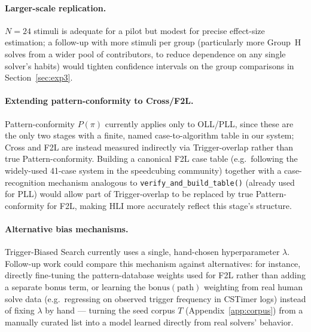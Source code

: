 \documentclass[10pt,conference]{article}
\begin{document}
\paragraph{Larger-scale replication.} $N=24$ stimuli is adequate for
a pilot but modest for precise effect-size estimation; a
follow-up with more stimuli per group (particularly more Group~H
solves from a wider pool of contributors, to reduce dependence on
any single solver's habits) would tighten confidence intervals on
the group comparisons in Section~\ref{sec:exp3}.

\paragraph{Extending pattern-conformity to Cross/F2L.}
Pattern-conformity $P(\pi)$ currently applies only to OLL/PLL, since
these are the only two stages with a finite, named
case-to-algorithm table in our system; Cross and F2L are instead
measured indirectly via Trigger-overlap rather than true
Pattern-conformity. Building a canonical F2L case table (e.g.\
following the widely-used 41-case system in the speedcubing
community) together with a case-recognition mechanism analogous to
\texttt{verify\_and\_build\_table()} (already used for PLL) would
allow part of Trigger-overlap to be replaced by true
Pattern-conformity for F2L, making HLI more accurately reflect this
stage's structure.

\paragraph{Alternative bias mechanisms.}
Trigger-Biased Search currently uses a single, hand-chosen
hyperparameter $\lambda$. Follow-up work could compare this
mechanism against alternatives: for instance, directly fine-tuning
the pattern-database weights used for F2L rather than adding a
separate bonus term, or learning the $\mathrm{bonus}(\mathrm{path})$
weighting from real human solve data (e.g.\ regressing on observed
trigger frequency in CSTimer logs) instead of fixing $\lambda$ by
hand --- turning the seed corpus $T$ (Appendix~\ref{app:corpus})
from a manually curated list into a model learned directly from real
solvers' behavior.

\end{document}
